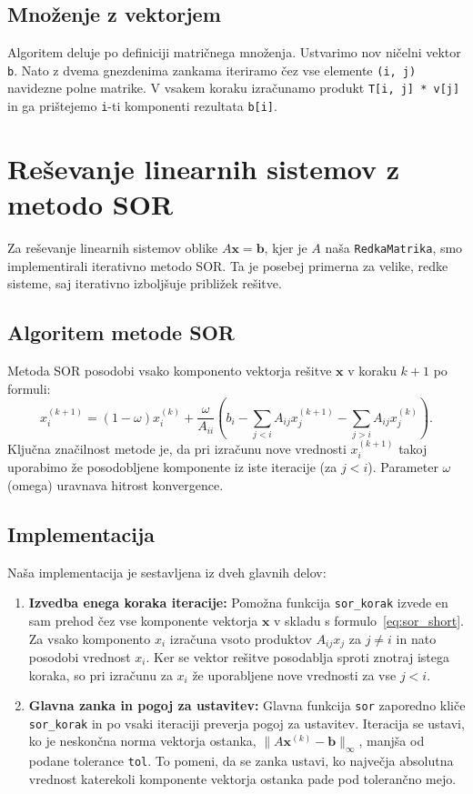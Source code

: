 \documentclass{article}
\begin{document}
\subsection{Množenje z vektorjem}
Algoritem deluje po definiciji matričnega množenja. Ustvarimo nov ničelni vektor \texttt{b}. 
Nato z dvema gnezdenima zankama iteriramo čez vse elemente \texttt{(i, j)} 
navidezne polne matrike. V vsakem koraku 
izračunamo produkt \texttt{T[i, j] * v[j]} in ga prištejemo \texttt{i}-ti 
komponenti rezultata \texttt{b[i]}.


\section{Reševanje linearnih sistemov z metodo SOR}

Za reševanje linearnih sistemov oblike $A\boldsymbol{x} = \boldsymbol{b}$, 
kjer je $A$ naša \texttt{RedkaMatrika}, smo implementirali iterativno 
metodo SOR. Ta je posebej primerna za velike, redke sisteme, saj 
iterativno izboljšuje približek rešitve.

\subsection{Algoritem metode SOR}
Metoda SOR posodobi vsako komponento vektorja rešitve 
$\boldsymbol{x}$ v koraku $k+1$ po formuli:
\begin{equation}
x_i^{(k+1)} = (1 - \omega) x_i^{(k)} + \frac{\omega}{A_{ii}} 
\left( b_i - \sum_{j<i} A_{ij}x_j^{(k+1)} - \sum_{j>i} A_{ij}x_j^{(k)} \right).
\label{eq:sor_short}
\end{equation}
Ključna značilnost metode je, da pri izračunu nove vrednosti $x_i^{(k+1)}$ 
takoj uporabimo že posodobljene komponente iz iste iteracije (za $j<i$). 
Parameter $\omega$ (omega) uravnava hitrost konvergence.

\subsection{Implementacija}
Naša implementacija je sestavljena iz dveh glavnih delov:
\begin{enumerate}
    \item \textbf{Izvedba enega koraka iteracije:} Pomožna funkcija 
    \texttt{sor\_korak} izvede en sam prehod čez vse komponente vektorja 
    $\boldsymbol{x}$ v skladu s formulo~\eqref{eq:sor_short}. Za vsako 
    komponento $x_i$ izračuna vsoto produktov $A_{ij}x_j$ za $j \neq i$ in 
    nato posodobi vrednost $x_i$. Ker se vektor rešitve posodablja sproti 
    znotraj istega koraka, so pri izračunu za $x_i$ že uporabljene nove 
    vrednosti za vse $j<i$.

    \item \textbf{Glavna zanka in pogoj za ustavitev:} Glavna funkcija 
    \texttt{sor} zaporedno kliče \texttt{sor\_korak} in po vsaki iteraciji 
    preverja pogoj za ustavitev. Iteracija se ustavi, ko je neskončna norma 
    vektorja ostanka, $\|A\boldsymbol{x}^{(k)} - \boldsymbol{b}\|_\infty$, 
    manjša od podane tolerance \texttt{tol}. To pomeni, da se zanka ustavi, 
    ko največja absolutna vrednost katerekoli komponente vektorja ostanka pade 
    pod tolerančno mejo.
\end{enumerate}
\end{document}

